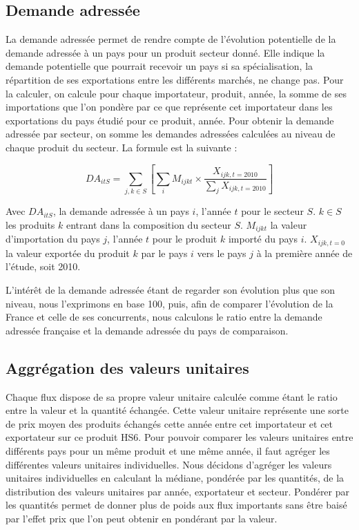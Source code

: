 \documentclass[french,10pt,a4paper]{article}
\begin{document}
\subsection*{Demande adressée}

La demande adressée permet de rendre compte de l'évolution potentielle de la demande adressée à un pays pour un produit secteur donné. Elle indique la demande potentielle que pourrait recevoir un pays si sa spécialisation, la répartition de ses exportations entre les différents marchés, ne change pas. Pour la calculer, on calcule pour chaque importateur, produit, année, la somme de ses importations que l'on pondère par ce que représente cet importateur dans les exportations du pays étudié pour ce produit, année. Pour obtenir la demande adressée par secteur, on somme les demandes adressées calculées au niveau de chaque produit du secteur. La formule est la suivante :

\begin{equation}
\label{eq:1}
DA_{itS} = \sum_{j,k \in S} \left[ \sum_{i} M_{ijkt} \times \frac{X_{ijk,t=2010}}{\sum_{j}X_{ijk,t=2010}}\right]  
\end{equation}

Avec $DA_{itS}$, la demande adressée à un pays $i$, l'année $t$ pour le secteur $S$. $k \in S$ les produits $k$ entrant dans la composition du secteur $S$. $M_{ijkt}$ la valeur d'importation du pays $j$, l'année $t$ pour le produit $k$ importé du pays $i$. $X_{ijk, t=0}$ la valeur exportée du produit $k$ par le pays $i$ vers le pays $j$ à la première année de l'étude, soit 2010.

L'intérêt de la demande adressée étant de regarder son évolution plus que son niveau, nous l'exprimons en base 100, puis, afin de comparer l'évolution de la France et celle de ses concurrents, nous calculons le ratio entre la demande adressée française et la demande adressée du pays de comparaison. 

\subsection*{Aggrégation des valeurs unitaires}

Chaque flux dispose de sa propre valeur unitaire calculée comme étant le ratio entre la valeur et la quantité échangée. Cette valeur unitaire représente une sorte de prix moyen des produits échangés cette année entre cet importateur et cet exportateur sur ce produit HS6. Pour pouvoir comparer les valeurs unitaires entre différents pays pour un même produit et une même année, il faut agréger les différentes valeurs unitaires individuelles. Nous décidons d'agréger les valeurs unitaires individuelles en calculant la médiane, pondérée par les quantités, de la distribution des valeurs unitaires par année, exportateur et secteur. Pondérer par les quantités permet de donner plus de poids aux flux importants sans être baisé par l'effet prix que l'on peut obtenir en pondérant par la valeur.
\end{document}
